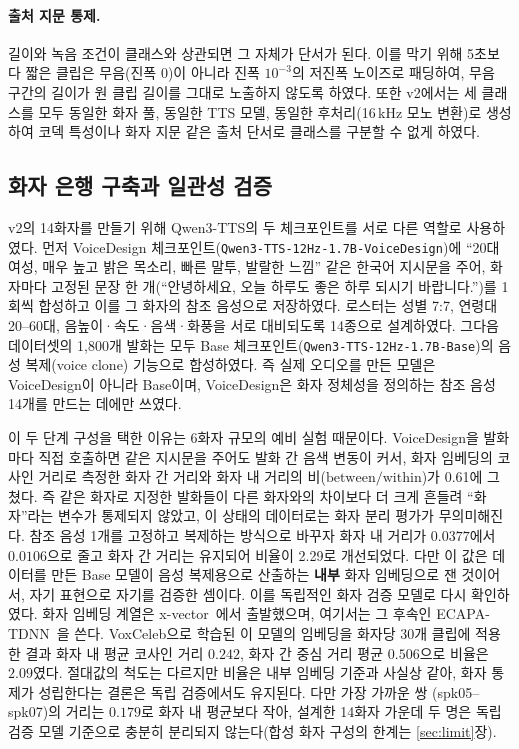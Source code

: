 \documentclass[11pt]{article}
\renewcommand{\emph}[1]{\textbf{#1}}
\begin{document}
\paragraph{출처 지문 통제.}
길이와 녹음 조건이 클래스와 상관되면 그 자체가 단서가 된다. 이를 막기 위해 5초보다 짧은
클립은 무음(진폭 0)이 아니라 진폭 $10^{-3}$의 저진폭 노이즈로 패딩하여, 무음 구간의 길이가
원 클립 길이를 그대로 노출하지 않도록 하였다. 또한 v2에서는 세 클래스를 모두 동일한 화자
풀, 동일한 TTS 모델, 동일한 후처리(16\,kHz 모노 변환)로 생성하여 코덱 특성이나 화자 지문
같은 출처 단서로 클래스를 구분할 수 없게 하였다.


\subsection{화자 은행 구축과 일관성 검증}\label{sec:data:voicebank}
v2의 14화자를 만들기 위해 Qwen3-TTS의 두 체크포인트를 서로 다른 역할로 사용하였다.
먼저 VoiceDesign 체크포인트(\texttt{Qwen3-TTS-12Hz-1.7B-VoiceDesign})에 ``20대 여성, 매우
높고 밝은 목소리, 빠른 말투, 발랄한 느낌'' 같은 한국어 지시문을 주어, 화자마다 고정된 문장
한 개(``안녕하세요, 오늘 하루도 좋은 하루 되시기 바랍니다.'')를 1회씩 합성하고 이를 그
화자의 참조 음성으로 저장하였다. 로스터는 성별 7:7, 연령대 20--60대, 음높이·속도·음색·화풍을
서로 대비되도록 14종으로 설계하였다. 그다음 데이터셋의 1{,}800개 발화는 모두 Base
체크포인트(\texttt{Qwen3-TTS-12Hz-1.7B-Base})의 음성 복제(voice clone) 기능으로 합성하였다.
즉 실제 오디오를 만든 모델은 VoiceDesign이 아니라 Base이며, VoiceDesign은 화자 정체성을
정의하는 참조 음성 14개를 만드는 데에만 쓰였다.

이 두 단계 구성을 택한 이유는 6화자 규모의 예비 실험 때문이다. VoiceDesign을 발화마다 직접
호출하면 같은 지시문을 주어도 발화 간 음색 변동이 커서, 화자 임베딩의 코사인 거리로 측정한
화자 간 거리와 화자 내 거리의 비($\mathrm{between}/\mathrm{within}$)가 0.61에 그쳤다. 즉
같은 화자로 지정한 발화들이 다른 화자와의 차이보다 더 크게 흔들려 ``화자''라는 변수가 통제되지
않았고, 이 상태의 데이터로는 화자 분리 평가가 무의미해진다. 참조 음성 1개를 고정하고
복제하는 방식으로 바꾸자 화자 내 거리가 $0.0377$에서 $0.0106$으로 줄고 화자 간 거리는
유지되어 비율이 2.29로 개선되었다. 다만 이 값은 데이터를 만든 Base 모델이 음성 복제용으로
산출하는 \emph{내부} 화자 임베딩으로 잰 것이어서, 자기 표현으로 자기를 검증한 셈이다. 이를
독립적인 화자 검증 모델로 다시 확인하였다. 화자 임베딩 계열은 x-vector~\cite{snyder2018xvector}에서
출발했으며, 여기서는 그 후속인 ECAPA-TDNN~\cite{desplanques2020ecapa}을 쓴다. VoxCeleb으로 학습된 이 모델의
임베딩을 화자당 30개 클립에 적용한 결과 화자 내 평균 코사인 거리 $0.242$, 화자 간 중심 거리
평균 $0.506$으로 비율은 $2.09$였다. 절대값의 척도는 다르지만 비율은 내부 임베딩 기준과
사실상 같아, 화자 통제가 성립한다는 결론은 독립 검증에서도 유지된다. 다만 가장 가까운 쌍
(spk05--spk07)의 거리는 $0.179$로 화자 내 평균보다 작아, 설계한 14화자 가운데 두 명은 독립
검증 모델 기준으로 충분히 분리되지 않는다(합성 화자 구성의 한계는 \ref{sec:limit}장).
\end{document}
